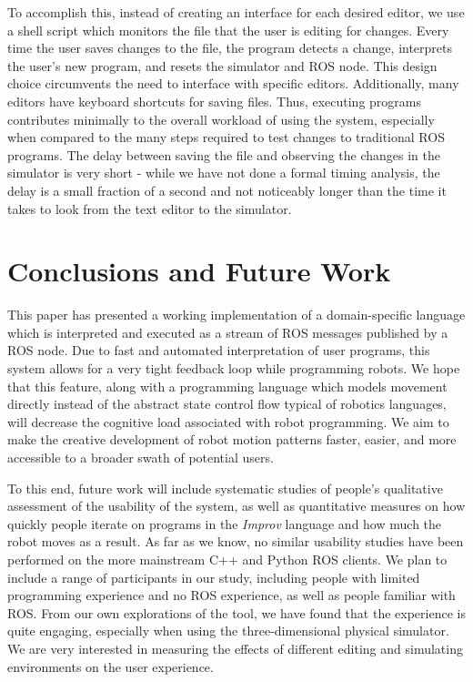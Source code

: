 \documentclass[sigconf]{acmart}
\begin{document}
To accomplish this, instead of creating an interface for each desired
editor, we use a shell script which monitors the file that the user is
editing for changes. Every time the user saves changes to the file, the
program detects a change, interprets the user's new program, and resets
the simulator and ROS node. This design choice circumvents the need to
interface with specific editors. Additionally, many editors have
keyboard shortcuts for saving files. Thus, executing programs
contributes minimally to the overall workload of using the system,
especially when compared to the many steps required to test changes to
traditional ROS programs. The delay between saving the file and observing the
changes in the simulator is very short - while we have not done a formal timing
analysis, the delay is a small fraction of a second and not noticeably longer than the
time it takes to look from the text editor to the simulator.

\section{Conclusions and Future
Work}\label{conclusions-and-future-work}

This paper has presented a working implementation of a domain-specific
language which is interpreted and executed as a stream of ROS messages published
by a ROS node. Due to fast and automated interpretation of user programs, this system allows for a very tight
feedback loop while programming robots. We hope that this feature,
along with a programming language which models movement directly instead of the
abstract state control flow typical of robotics languages, will decrease the
cognitive load associated with robot programming. We aim to make the creative
development of robot motion patterns faster, easier, and more accessible to a
broader swath of potential users.


To this end, future work will include systematic studies of people's qualitative
assessment of the usability of the system, as well as quantitative measures on
how quickly people iterate on programs in the \emph{Improv} language and how much the
robot moves as a result. As far as we know, no similar usability studies have
been performed on the more mainstream C++ and Python ROS clients. We plan to
include a range of participants in our study, including people with limited
programming experience and no ROS experience, as well as people familiar with
ROS. From our own explorations of the tool, we have found that the
experience is quite engaging, especially when using the three-dimensional
physical simulator. We are very interested in measuring the effects of different
editing and simulating environments on the user experience.
\end{document}
